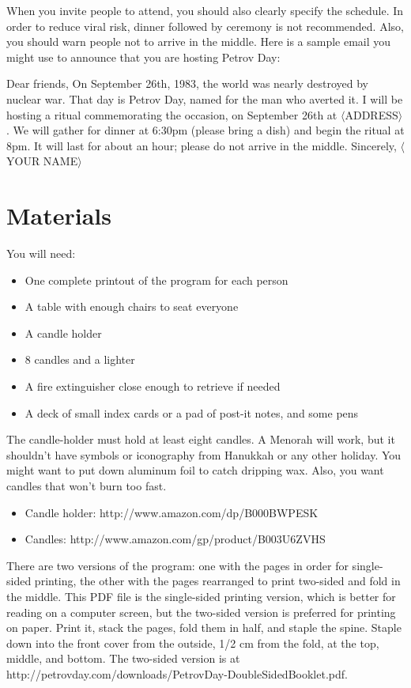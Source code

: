 \documentclass{article}
\begin{document}
When you invite people to attend, you should also clearly specify the
schedule. In order to reduce viral risk, dinner followed by ceremony is not
recommended. Also, you should warn people not to arrive in the middle. Here is
a sample email you might use to announce that you are hosting Petrov Day:

\begin{center}
	\parbox{4.5in}{
	Dear friends,\newline
	On September 26th, 1983, the world was nearly destroyed by nuclear war.
	That day is Petrov Day, named for the man who averted it. I will be hosting
	a ritual commemorating the occasion, on September 26th at $\langle$ADDRESS$\rangle$. We
	will gather for dinner at 6:30pm (please bring a dish) and begin the ritual
	at 8pm. It will last for about an hour; please do not arrive in the middle.\newline
	Sincerely,\newline
	$\langle$YOUR NAME$\rangle$}
\end{center}

\section{Materials}
You will need:

\begin{itemize} \itemsep0pt \parskip0pt 
	\item One complete printout of the program for each person
	\item A table with enough chairs to seat everyone
	\item A candle holder
	\item 8 candles and a lighter
	\item A fire extinguisher close enough to retrieve if needed
	\item A deck of small index cards or a pad of post-it notes, and some pens
\end{itemize}

The candle-holder must hold at least eight candles. A Menorah will work, but it
shouldn't have symbols or iconography from Hanukkah or any other holiday. You
might want to put down aluminum foil to catch dripping wax. Also, you want
candles that won't burn too fast.

\begin{itemize} \itemsep0pt \parskip0pt 
	\item Candle holder: http://www.amazon.com/dp/B000BWPESK
	\item Candles: http://www.amazon.com/gp/product/B003U6ZVHS
\end{itemize}

There are two versions of the program: one with the pages in order for
single-sided printing, the other with the pages rearranged to print two-sided
and fold in the middle. This PDF file is the single-sided printing version,
which is better for reading on a computer screen, but the two-sided version is
preferred for printing on paper. Print it, stack the pages, fold them in half,
and staple the spine. Staple down into the front cover from the outside, 1/2
cm from the fold, at the top, middle, and bottom. The two-sided version is at
http://petrovday.com/downloads/PetrovDay-DoubleSidedBooklet.pdf{}.
\end{document}
